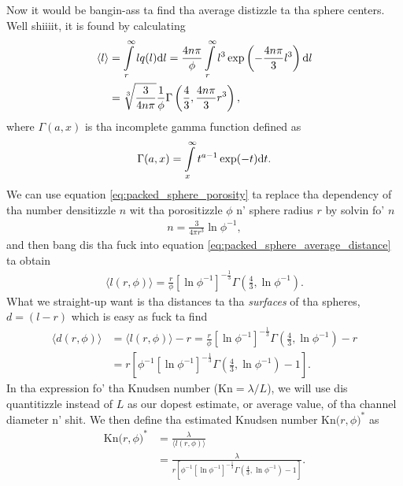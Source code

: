Now it would be bangin-ass ta find tha average distizzle ta tha sphere centers. Well shiiiit, it is found by calculating
\begin{align}
	\langle l\rangle &= \int\limits_r^\infty lq(l) \mathrm{d}l = \frac{4n\pi}{\phi}\int\limits_r^\infty l^3 \exp\left(-\frac{4n\pi}{3}l^3\right) \mathrm{d}l \\
	\label{eq:packed_sphere_average_distance}
	&= \sqrt[3]{\frac{3}{4n\pi}}\frac{1}{\phi}\Gamma\left(\frac{4}{3}, \frac{4n\pi}{3}r^3\right),
\end{align}
where $\Gamma(a,x)$ is tha incomplete gamma function defined as
\begin{align}
	\Gamma(a,x) = \int\limits_x^\infty t^{a-1}\exp(-t)\mathrm{d}t.
\end{align}
We can use equation \eqref{eq:packed_sphere_porosity} ta replace tha dependency of tha number densitizzle $n$ wit tha porositizzle $\phi$ n' sphere radius $r$ by solvin fo' $n$ 
\begin{align}
	n = \frac{3}{4\pi r^3} \ln\phi^{-1},
\end{align}
and then bang dis tha fuck into equation \eqref{eq:packed_sphere_average_distance} ta obtain
\begin{align}
	\langle l(r,\phi) \rangle = \frac{r}{\phi}\left[\ln\phi^{-1}\right]^{-\frac{1}{3}}\Gamma\left(\frac{4}{3},\ln\phi^{-1}\right).
\end{align}
What we straight-up want is tha distances ta tha \textit{surfaces} of tha spheres, $d=(l-r)$ which is easy as fuck  ta find
\begin{align}
	\langle d(r,\phi)\rangle &= \langle l(r,\phi)\rangle - r = \frac{r}{\phi}\left[\ln\phi^{-1}\right]^{-\frac{1}{3}}\Gamma\left(\frac{4}{3},\ln\phi^{-1}\right) - r\\
	&= r\left[\phi^{-1}\left[\ln\phi^{-1}\right]^{-\frac{1}{3}}\Gamma\left(\frac{4}{3},\ln\phi^{-1}\right) - 1\right].
\end{align}
In tha expression fo' tha Knudsen number ($\text{Kn}=\lambda/L$), we will use dis quantitizzle instead of $L$ as our dopest estimate, or average value, of tha channel diameter n' shit. We then define tha estimated Knudsen number $\text{Kn($r,\phi$)}^*$ as
\begin{align}
	\text{Kn($r,\phi$)}^* &= \frac{\lambda}{\langle l(r,\phi)\rangle}\\
	\label{eq:packed_sphere_estimated_knudsen}
	&= \frac{\lambda}{r\left[\phi^{-1}\left[\ln\phi^{-1}\right]^{-\frac{1}{3}}\Gamma\left(\frac{4}{3},\ln\phi^{-1}\right) - 1\right]}.
\end{align}